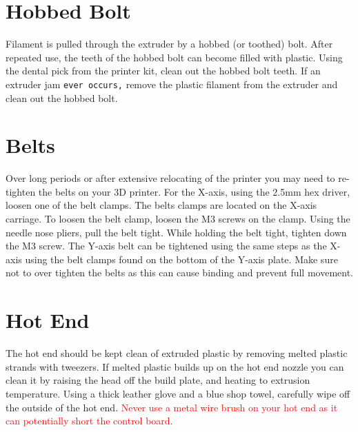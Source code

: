 \section{Hobbed Bolt}
Filament is pulled through the extruder by a hobbed (or toothed) bolt. After repeated use, the teeth of the hobbed bolt can become filled with plastic. Using the dental pick from the printer kit, clean out the hobbed bolt teeth. If an extruder jam \texttt{ever occurs,} remove the plastic filament from the extruder and clean out the hobbed bolt.

\begin{comment}
\section{Software}
\index{software}
\index{download}
Aleph Objects, Inc.\textsuperscript{\miniscule{\textregistered}} will release a new stable version of Cura LulzBot\textsuperscript{\miniscule{\textregistered}} Edition, typically every quarter. It is best to update Cura every time a new version is released. Each software update can bring advances in print quality, reliability, and print times. The files are available at \texttt{http://lulzbot.com/cura}. You can also find updated software versions in the Download section at: \texttt{http://LulzBot.com/downloads}.
\end{comment}

\section{Belts}
Over long periods or after extensive relocating of the printer you may need to re-tighten the belts on your 3D printer. For the X-axis, using the 2.5mm hex driver, loosen one of the belt clamps. The belts clamps are located on the X-axis carriage. To loosen the belt clamp, loosen the M3 screws on the clamp. Using the needle nose pliers, pull the belt tight. While holding the belt tight, tighten down the M3 screw. The Y-axis belt can be tightened using the same steps as the X-axis using the belt clamps found on the bottom of the Y-axis plate. Make sure not to over tighten the belts as this can cause binding and prevent full movement.

\section{Hot End}
The hot end should be kept clean of extruded plastic by removing melted plastic strands with tweezers. If melted plastic builds up on the hot end nozzle you can clean it by raising the head off the build plate, and heating to extrusion temperature. Using a thick leather glove and a blue shop towel, carefully wipe off the outside of the hot end. \textcolor{red}{Never use a metal wire brush on your hot end as it can potentially short the control board.}


